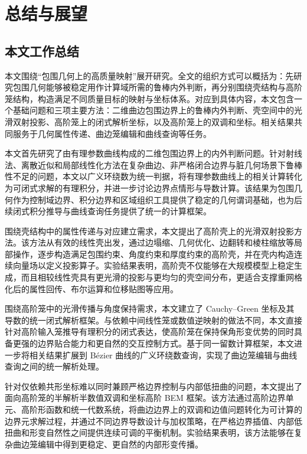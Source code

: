 \chapter{总结与展望}

\section{本文工作总结}
本文围绕“包围几何上的高质量映射”展开研究。全文的组织方式可以概括为：先研究包围几何能够被稳定用作计算域所需的鲁棒内外判断，再分别围绕壳结构与高阶笼结构，构造满足不同质量目标的映射与坐标体系。对应到具体内容，本文包含一个基础问题和三项主要方法：二维曲边包围边界上的鲁棒内外判断、壳空间中的光滑双射投影、高阶笼上的闭式解析坐标，以及高阶笼上的双调和坐标。相关结果共同服务于几何属性传递、曲边笼编辑和曲线查询等任务。

本文首先研究了由有理参数曲线构成的二维包围边界上的内外判断问题。针对射线法、离散近似和局部线性化方法在复杂曲边、非严格闭合边界与脏几何场景下鲁棒性不足的问题，本文以广义环绕数为统一判据，将有理参数曲线上的相关计算转化为可闭式求解的有理积分，并进一步讨论边界点情形与导数计算。该结果为包围几何作为控制域边界、积分边界和区域组织工具提供了稳定的几何谓词基础，也为后续闭式积分推导与曲线查询任务提供了统一的计算框架。

围绕壳结构中的属性传递与对应建立需求，本文提出了高阶壳上的光滑双射投影方法。该方法从有效的线性壳出发，通过边塌缩、几何优化、边翻转和棱柱缩放等局部操作，逐步构造满足包围约束、角度约束和厚度约束的高阶壳，并在壳内构造连续向量场以定义投影算子。实验结果表明，高阶壳不仅能够在大规模模型上稳定生成，而且相较线性壳具有更光滑的投影与更均匀的壳空间分布，更适合支撑重网格化后的属性回传、布尔运算和位移贴图等应用。

围绕高阶笼中的光滑传播与角度保持需求，本文建立了 Cauchy--Green 坐标及其导数的统一闭式解析框架。与依赖中间线性笼或数值逆映射的做法不同，本文直接针对高阶输入笼推导有理积分的闭式表达，使高阶笼在保持保角形变优势的同时具备更强的边界贴合能力和更自然的交互控制方式。基于同一留数计算框架，本文进一步将相关结果扩展到 B\'{e}zier 曲线的广义环绕数查询，实现了曲边笼编辑与曲线查询之间的统一解析处理。

针对仅依赖共形坐标难以同时兼顾严格边界控制与内部低扭曲的问题，本文提出了面向高阶笼的半解析半数值双调和坐标高阶 BEM 框架。该方法通过高阶边界单元、高阶形函数和统一代数系统，将曲边边界上的双调和边值问题转化为可计算的边界元求解过程，并通过不同边界导数设计与加权策略，在严格边界插值、内部低扭曲和形变自然性之间提供连续可调的平衡机制。实验结果表明，该方法能够在复杂曲边笼编辑中得到更稳定、更自然的内部形变传播。

